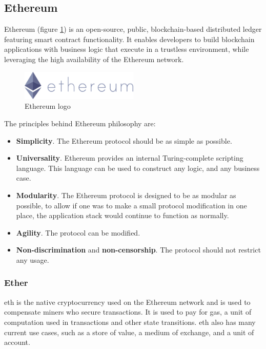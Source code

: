 \documentclass[a4paper, 12pt]{article} %
\begin{document}
    \subsection{Ethereum}
        Ethereum\cite{ethereum} (figure \ref{fig:ethereum_logo}) is an open-source, public, blockchain-based distributed ledger featuring smart contract functionality. It enables developers to build blockchain applications with business logic that execute in a trustless environment, while leveraging the high availability of the Ethereum network. 
        \begin{figure}[h]
            \centering
            \includegraphics[width=0.5\textwidth]{ethereum-logo-portrait-purple.png}
            \caption{Ethereum logo}
            \label{fig:ethereum_logo}
        \end{figure}
        The principles behind Ethereum philosophy are\cite{ethereumWhitepaper}:
        \begin{itemize}
            \item \textbf{Simplicity}. The Ethereum protocol should be as simple as possible.
            \item \textbf{Universality}. Ethereum provides an internal Turing-complete scripting language. This language can be used to construct any logic, and any business case.
            \item \textbf{Modularity}. The Ethereum protocol is designed to be as modular as possible, to allow if one was to make a small protocol modification in one place, the application stack would continue to function as normally. 
            \item \textbf{Agility}. The protocol can be modified.
            \item \textbf{Non-discrimination} and \textbf{non-censorship}. The protocol should not restrict any usage.
        \end{itemize}
        
        \subsubsection{Ether}
            \acrfull{eth} is the native cryptocurrency used on the Ethereum network and is used to compensate miners who secure transactions. It is used to pay for gas, a unit of computation used in transactions and other state transitions.
            \acrlong{eth} also has many current use cases, such as a store of value, a medium of exchange, and a unit of account.
            
\end{document}
